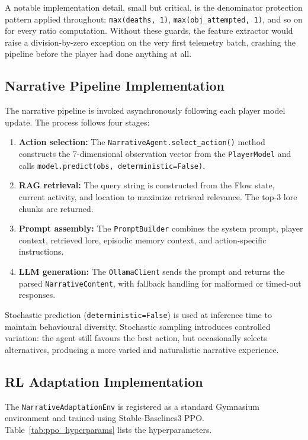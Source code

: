 A notable implementation detail, small but critical, is the denominator protection pattern applied throughout: \texttt{max(deaths, 1)}, \texttt{max(obj\_attempted, 1)}, and so on for every ratio computation. Without these guards, the feature extractor would raise a division-by-zero exception on the very first telemetry batch, crashing the pipeline before the player had done anything at all.

\subsection{Narrative Pipeline Implementation}

The narrative pipeline is invoked asynchronously following each player model update. The process follows four stages:

\begin{enumerate}
\item \textbf{Action selection:} The \texttt{NarrativeAgent.select\_action()} method constructs the 7-dimensional observation vector from the \texttt{PlayerModel} and calls \texttt{model.predict(obs, deterministic=False)}.
\item \textbf{RAG retrieval:} The query string is constructed from the Flow state, current activity, and location to maximize retrieval relevance. The top-3 lore chunks are returned.
\item \textbf{Prompt assembly:} The \texttt{PromptBuilder} combines the system prompt, player context, retrieved lore, episodic memory context, and action-specific instructions.
\item \textbf{LLM generation:} The \texttt{OllamaClient} sends the prompt and returns the parsed \texttt{NarrativeContent}, with fallback handling for malformed or timed-out responses.
\end{enumerate}

Stochastic prediction (\texttt{deterministic=False}) is used at inference time to maintain behavioural diversity. Stochastic sampling introduces controlled variation: the agent still favours the best action, but occasionally selects alternatives, producing a more varied and naturalistic narrative experience.

\subsection{RL Adaptation Implementation}

The \texttt{NarrativeAdaptationEnv} is registered as a standard Gymnasium environment and trained using Stable-Baselines3 PPO. Table~\ref{tab:ppo_hyperparams} lists the hyperparameters.

